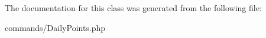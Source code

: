 

The documentation for this class was generated from the following file\-:\begin{DoxyCompactItemize}
\item 
commands/Daily\-Points.\-php\end{DoxyCompactItemize}
